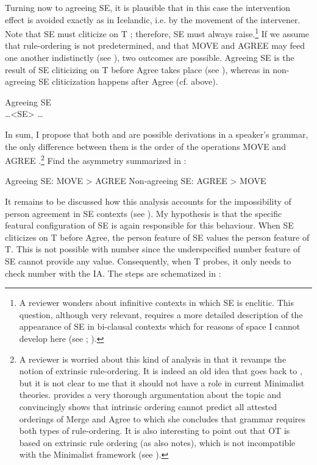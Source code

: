 \documentclass[output=paper,colorlinks,citecolor=brown]{langscibook}
\begin{document}
Turning now to agreeing SE, it is plausible that in this case the intervention effect is avoided exactly as in Icelandic, i.e. by the movement of the intervener. Note that SE must cliticize on T \citep{Cinque1988d,DAlessandro2007}; therefore, SE must always raise.\footnote{A reviewer wonders about infinitive contexts in which SE is enclitic. This question, although very relevant, requires a more detailed description of the appearance of SE in bi-clausal contexts which for reasons of space I cannot develop here (see \citealt[1705--1715]{Mendikoetxea1999}; \citealt[43--49]{SanchezLopez2002}).} If we assume that rule-ordering is not predetermined, and that MOVE and AGREE may feed one another indistinctly (see \cite{Georgi2014}), two outcomes are possible. Agreeing SE is the result of SE cliticizing on T before Agree takes place (see ), whereas in non-agreeing SE cliticization happens after Agree (cf.  above).

\ea \label{ex:05:analysis}
    Agreeing SE \\
     \dots <SE> \dots {}
\z

\vspace{3mm}

In sum, I propose that both  and  are possible derivations in a speaker's grammar, the only difference between them is the order of the operations MOVE and AGREE \citep{Obataetal2015, Obata_Epstein2016}.\footnote{A reviewer is worried about this kind of analysis in that it revamps the notion of extrinsic rule-ordering. It is indeed an old idea that goes back to \citet{Chomsky1965}, but it is not clear to me that it should not have a role in current Minimalist theories. \citet{Georgi2014} provides a very thorough argumentation about the topic and convincingly shows that intrinsic ordering cannot predict all attested orderings of Merge and Agree to which she concludes that grammar requires both types of rule-ordering. It is also interesting to point out that OT is based on extrinsic rule ordering (as \citealt[253]{Georgi2014} also notes), which is not incompatible with the Minimalist framework (see \citealt{BroekhuisWoolford2010}).} Find the asymmetry summarized in :

\ea \label{ex:05:order}
    \ea Agreeing SE: MOVE > AGREE
    \ex Non-agreeing SE: AGREE > MOVE
\z \z

It remains to be discussed how this analysis accounts for the impossibility of person agreement in SE contexts (see ). My hypothesis is that the specific featural configuration of SE is again responsible for this behaviour. When SE cliticizes on T before Agree, the person feature of SE values the person feature of T. This is not possible with number since the underspecified number feature of SE cannot provide any value. Consequently, when T probes, it only needs to check number with the IA. The steps are schematized in :
\end{document}
